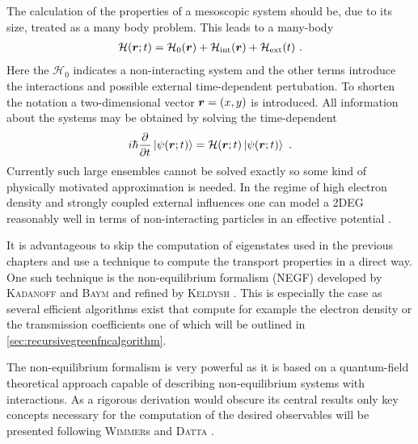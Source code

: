 The calculation of the properties of a mesoscopic system should be, due to its size, treated as a many body problem. This leads to a many-body \hamil{}
\begin{align}
\mathcal{H}(\boldsymbol{r};t) = \mathcal{H}_0(\boldsymbol{r}) + \mathcal{H}_{\text{int}}(\boldsymbol{r})+\mathcal{H}_{\text{ext}}(t)\ .
\end{align}
Here the $\mathcal{H}_0$ indicates a non-interacting system and the other terms introduce the interactions and possible external time-dependent pertubation. To shorten the notation a two-dimensional vector $\boldsymbol{r}=(x,y)$ is introduced.  
All information about the systems may be obtained by solving the time-dependent \sdg{}
\begin{align}
i\hbar \frac{\partial }{\partial t} \left| \psi(\boldsymbol{r};t) \right> = \mathcal{H}(\boldsymbol{r};t) \left| \psi(\boldsymbol{r};t) \right>\ .
\label{eqn:timedependendsdg}
\end{align}
Currently such large ensembles cannot be solved exactly so some kind of physically motivated approximation is needed. In the regime of high electron density and strongly coupled external influences one can model a 2DEG reasonably well in terms of non-interacting particles in an effective potential \cite{fetter2003quantum}. \par
It is advantageous to skip the computation of eigenstates used in the previous chapters and use a technique to compute the transport properties in a direct way. One such technique is the non-equilibrium \gfnc{} formalism (NEGF) developed by \textsc{Kadanoff} and \textsc{Baym} \cite{kadanoff1962quantum} and refined by \textsc{Keldysh} \cite{keldysh1965}. This is especially the case as several efficient algorithms exist that compute for example the electron density or the transmission coefficients one of which will be outlined in \cref{sec:recursivegreenfncalgorithm}.\par
The non-equilibrium \gfnc{} formalism is very powerful as it is based on a quantum-field theoretical approach capable of describing non-equilibrium systems with interactions. As a rigorous derivation would obscure its central results only key concepts necessary for the computation of the desired observables will be presented following \textsc{Wimmer}s \cite{Wimmer2009Thesis} and \textsc{Datta} \cite{Datta1997}.\par
